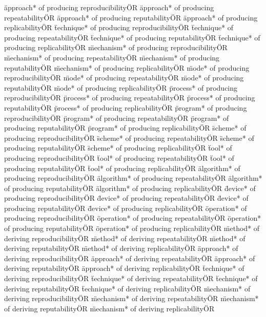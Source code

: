 \documentclass[
10pt, %
a4paper, %
oneside, %
headinclude,footinclude, %
BCOR5mm, %
]{scrartcl}
\begin{document}
\"approach* of producing reproducibility\" OR \"approach* of producing repeatability\" OR \"approach* of producing reputability\" OR \"approach* of producing replicability\" OR 
\"technique* of producing reproducibility\" OR \"technique* of producing repeatability\" OR \"technique* of producing reputability\" OR \"technique* of producing replicability\" OR 
\"mechanism* of producing reproducibility\" OR \"mechanism* of producing repeatability\" OR \"mechanism* of producing reputability\" OR \"mechanism* of producing replicability\" OR 
\"mode* of producing reproducibility\" OR \"mode* of producing repeatability\" OR \"mode* of producing reputability\" OR \"mode* of producing replicability\" OR 
\"process* of producing reproducibility\" OR \"process* of producing repeatability\" OR \"process* of producing reputability\" OR \"process* of producing replicability\" OR 
\"program* of producing reproducibility\" OR \"program* of producing repeatability\" OR \"program* of producing reputability\" OR \"program* of producing replicability\" OR 
\"scheme* of producing reproducibility\" OR \"scheme* of producing repeatability\" OR \"scheme* of producing reputability\" OR \"scheme* of producing replicability\" OR 
\"tool* of producing reproducibility\" OR \"tool* of producing repeatability\" OR \"tool* of producing reputability\" OR \"tool* of producing replicability\" OR 
\"algorithm* of producing reproducibility\" OR \"algorithm* of producing repeatability\" OR \"algorithm* of producing reputability\" OR \"algorithm* of producing replicability\" OR 
\"device* of producing reproducibility\" OR \"device* of producing repeatability\" OR \"device* of producing reputability\" OR \"device* of producing replicability\" OR 
\"operation* of producing reproducibility\" OR \"operation* of producing repeatability\" OR \"operation* of producing reputability\" OR \"operation* of producing replicability\" OR 
\"method* of deriving reproducibility\" OR \"method* of deriving repeatability\" OR \"method* of deriving reputability\" OR \"method* of deriving replicability\" OR 
\"approach* of deriving reproducibility\" OR \"approach* of deriving repeatability\" OR \"approach* of deriving reputability\" OR \"approach* of deriving replicability\" OR 
\"technique* of deriving reproducibility\" OR \"technique* of deriving repeatability\" OR \"technique* of deriving reputability\" OR \"technique* of deriving replicability\" OR 
\"mechanism* of deriving reproducibility\" OR \"mechanism* of deriving repeatability\" OR \"mechanism* of deriving reputability\" OR \"mechanism* of deriving replicability\" OR 
\end{document}
